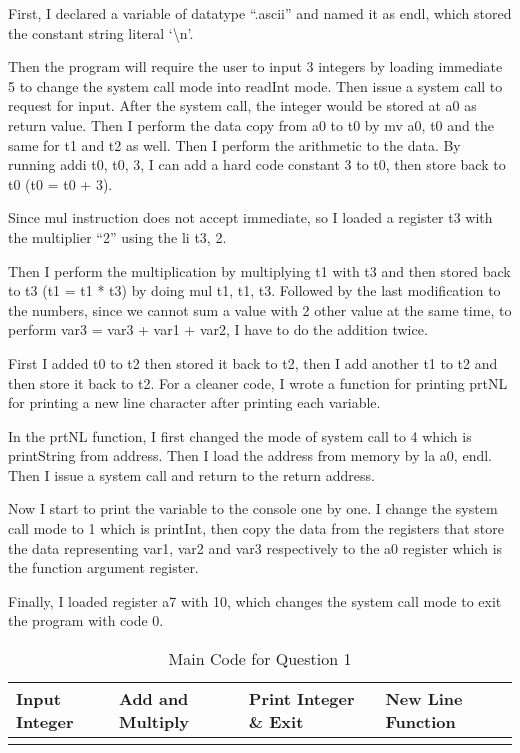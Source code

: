 \documentclass[10pt,a4paper]{article}
\begin{document}
\begin{ans} 

    First, I declared a variable of datatype “.ascii” and named it as endl, which stored the constant 
string literal `\textbackslash n'. 

    Then the program will require the user to input 3 integers by loading immediate 5 to change the system call 
mode into readInt mode. Then issue a system call to request for input. After the system call, the integer would 
be stored at a0 as return value. Then I perform the data copy from a0 to t0 by mv a0, t0 and the same for t1 
and t2 as well. Then I perform the arithmetic to the data. By running addi t0, t0, 3, I can add a hard code 
constant 3 to t0, then store back to t0 (t0 = t0 + 3). 
 
    Since mul instruction does not accept immediate, so I loaded a register t3 with the multiplier “2” using the li t3, 2. 
 
    Then I perform the multiplication by multiplying t1 with t3 and then stored back to t3 (t1 = t1 * t3) by doing mul t1, t1, t3. 
Followed by the last modification to the numbers, since we cannot sum a value with 2 other value at the same time, to perform 
var3 = var3 + var1 + var2, I have to do the addition twice. 
 
	First I added t0 to t2 then stored it back to t2, then I add another t1 to t2 and then store it back to t2. For a cleaner code, 
I wrote a function for printing prtNL for printing a new line character after printing each variable. 
 
	In the prtNL function, I first changed the mode of system call to 4 which is printString from address. 
Then I load the address from memory by la a0, endl. Then I issue a system call and return to the return address. 
 
	Now I start to print the variable to the console one by one. I change the system call mode to 1 which is printInt, 
then copy the data from the registers that store the data representing var1, var2 and var3 respectively 
to the a0 register which is the function argument register. 
 
	Finally, I loaded register a7 with 10, which changes the system call mode to exit the program with code 0. 
 
\break

\begin{table}[htbp]
    \begin{center}
        \caption{Main Code for Question 1}
        \begin{tabular}{|M{2.5cm}|M{3.5cm}|M{2cm}|M{4cm}|}
            \hline
            Input Integer & Add and Multiply & Print Integer \& Exit & New Line Function\\
            \hline
            \centering
        

\end{tabular}
\end{center}
\end{table}
\end{ans}
\end{document}
